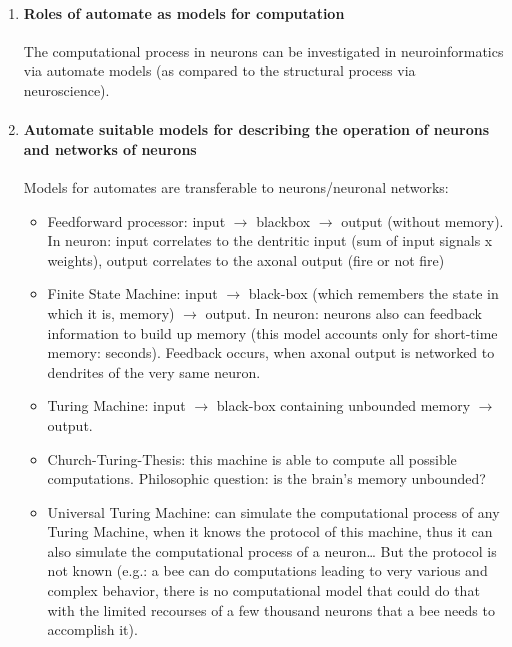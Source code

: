 \documentclass[12pt,article,oneside,a4paper]{memoir}
\begin{document}
\begin{enumerate}
\item \paragraph{Roles of automate as models for computation}

The computational process in neurons can be investigated in neuroinformatics
via automate models (as compared to the structural process via neuroscience).

\item \paragraph{Automate suitable models for describing the operation of
neurons and networks of neurons}

Models for automates are transferable to neurons/neuronal networks:
\begin{itemize}
\item Feedforward processor: input $\rightarrow$ blackbox $\rightarrow$ output
(without memory). In neuron: input correlates to the dentritic input (sum of
input signals x weights), output correlates to the axonal output (fire or not
fire)
\item Finite State Machine: input $\rightarrow$ black-box (which remembers the
state in which it is, memory) $\rightarrow$ output. In neuron: neurons also
can feedback information to build up memory (this model accounts only for
short-time memory: seconds). Feedback occurs, when axonal output is networked
to dendrites of the very same neuron.
\item Turing Machine: input $\rightarrow$ black-box containing unbounded memory
$\rightarrow$ output.
\item Church-Turing-Thesis: this machine is able to compute all possible
computations. Philosophic question: is the brain’s memory unbounded?
\item Universal Turing Machine: can simulate the computational process of any
Turing Machine, when it knows the protocol of this machine, thus it can also
simulate the computational process of a neuron… But the protocol is not known
(e.g.: a bee can do computations leading to very various and complex behavior,
there is no computational model that could do that with the limited recourses
of a few thousand neurons that a bee needs to accomplish it).
\end{itemize}
	

\end{enumerate}
\end{document}

